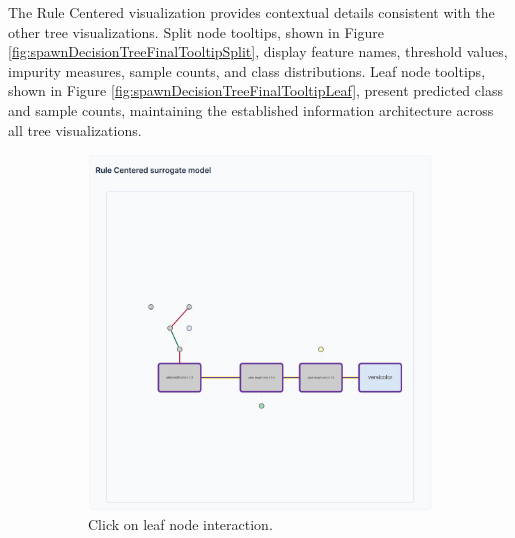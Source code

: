 The Rule Centered visualization provides contextual details consistent with the other tree visualizations. Split node tooltips, shown in Figure \ref{fig:spawnDecisionTreeFinalTooltipSplit}, display feature names, threshold values, impurity measures, sample counts, and class distributions. Leaf node tooltips, shown in Figure \ref{fig:spawnDecisionTreeFinalTooltipLeaf}, present predicted class and sample counts, maintaining the established information architecture across all tree visualizations.

\begin{figure}
    \centering
    \begin{subfigure}[c]{0.48\textwidth}
        \centering
        \includegraphics[width=\linewidth]{images/spawnDecisionTreeFinalLeafInteraction.png}
        \caption{Click on leaf node interaction.}
        \label{fig:spawnDecisionTreeFinalLeafClick}
    \end{subfigure}
    \vspace{0.3cm}
    \begin{subfigure}[c]{0.48\linewidth}
        \centering

\end{subfigure}
\end{figure}
